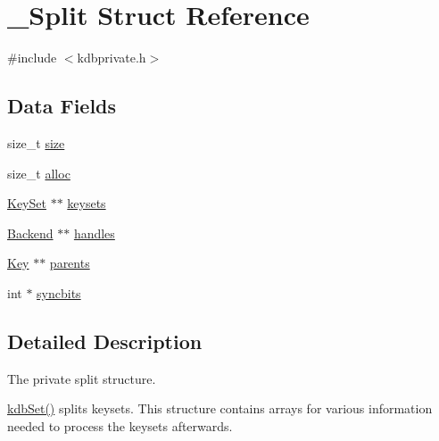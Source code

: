 \hypertarget{struct__Split}{
\section{\_\-Split Struct Reference}
\label{struct__Split}
}


{\ttfamily \#include $<$kdbprivate.h$>$}

\subsection*{Data Fields}
\begin{DoxyCompactItemize}
\item 
size\_\-t \hyperlink{struct__Split_a9c80f6a2c7069e4aca5a47df97e59547}{size}
\item 
size\_\-t \hyperlink{struct__Split_af084c1dd24de7ac71077e4c3f444599b}{alloc}
\item 
\hyperlink{struct__KeySet}{KeySet} $\ast$$\ast$ \hyperlink{struct__Split_a1e13e127dcd9d7ad26539dc092b6ca42}{keysets}
\item 
\hyperlink{struct__Backend}{Backend} $\ast$$\ast$ \hyperlink{struct__Split_accd11de3cd32ffa2bbaf46d3790fc677}{handles}
\item 
\hyperlink{struct__Key}{Key} $\ast$$\ast$ \hyperlink{struct__Split_a8a069875729343a5e3b2a65b313462fe}{parents}
\item 
int $\ast$ \hyperlink{struct__Split_a228c2be31180b880019d6b131919d2e7}{syncbits}
\end{DoxyCompactItemize}


\subsection{Detailed Description}
The private split structure.

\hyperlink{group__kdb_ga11436b058408f83d303ca5e996832bcf}{kdbSet()} splits keysets. This structure contains arrays for various information needed to process the keysets afterwards. 

